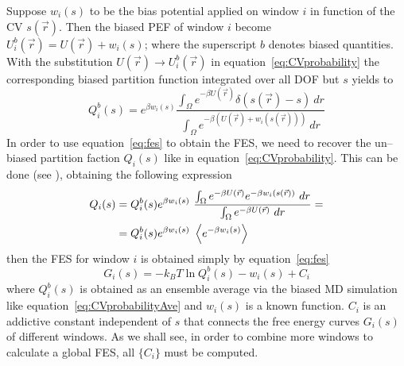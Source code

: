 Suppose $w_i(s)$ to be the bias potential applied on window $i$ in function of the \ac{CV} $s(\vec r)$. Then the
biased \ac{PEF} of window $i$ become $U_i^b(\vec r) = U(\vec r) + w_i(s)$; where the superscript $b$ denotes
biased quantities. With the substitution $U(\vec r) \rightarrow U_i^b(\vec r)$ in
equation~\eqref{eq:CVprobability} the corresponding biased partition function integrated over all \ac{DOF} but
$s$ yields to
\begin{equation*}
	Q_i^b(s) = e^{\beta w_i(s)}\frac{ \int_\Omega e^{-\beta U(\vec r)}\delta(s(\vec r) - s)\ dr }{\int_\Omega e^{-\beta (U(\vec r) + w_i(s(\vec r)))}\ dr}
\end{equation*}
In order to use equation~\eqref{eq:fes} to obtain the \ac{FES}, we need to recover the un--biased partition
faction $Q_i(s)$ like in equation~\eqref{eq:CVprobability}. This can be done (see \cite{Umbrella}), obtaining the
following expression
\begin{equation}
	\begin{aligned}
	Q_i(s) &= Q_i^b(s) e^{\beta w_i(s)}\ \frac{ \int_\Omega e^{-\beta U(\vec r)}e^{-\beta w_i(s(\vec r))}\ dr }{\int_\Omega e^{-\beta U(\vec r)}\ dr} = \\
		   &= Q_i^b(s) e^{\beta w_i(s)}\ \left \langle e^{-\beta w_i(s)} \right \rangle
	\end{aligned}
	\label{eq:windowPartFunc}
\end{equation}
then the \ac{FES} for window $i$ is obtained simply by equation~\eqref{eq:fes}
\begin{equation*}
	G_i(s) = -k_BT \ln Q_i^b(s) - w_i(s) + C_i
\end{equation*}
where $Q_i^b(s)$ is obtained as an ensemble average via the biased \ac{MD} simulation like
equation~\eqref{eq:CVprobabilityAve} and $w_i(s)$ is a known function. $C_i$ is an addictive constant independent
of $s$ that connects the free energy curves $G_i(s)$ of different windows. As we shall see, in order to combine
more windows to calculate a global \ac{FES}, all $\{C_i\}$ must be computed.

